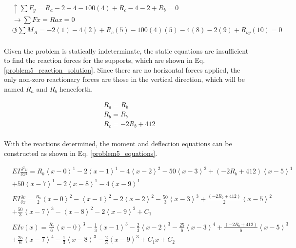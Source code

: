 \documentclass[a4paper]{article}
\begin{document}
\begin{equation}
\begin{split}
    &\uparrow \sum F_y = R_a - 2 - 4 - 100(4) + R_c -4 -2 + R_b = 0 \\
     &\rightarrow \sum Fx = R{ax} = 0 \\
     &\circlearrowleft \sum M_A = -2(1) - 4(2) + R_c(5) -100(4)(5) - 4(8) - 2(9) + R_{by}(10) = 0 \\
\end{split}
\label{problem5_reaction_equation}
\end{equation}

Given the problem is statically indeterminate, the static equations are insufficient to find the reaction forces for the supports, which are shown in Eq. \ref{problem5_reaction_solution}. Since there are no horizontal forces applied, the only non-zero reactionary forces are those in the vertical direction, which will be named $R_a$ and $R_b$ henceforth.

\begin{equation}
\begin{split}
    & R_a = R_b \\
    & R_b = R_b \\
    & R_c = -2R_b + 412 \\
\end{split}
\label{problem5_reaction_solution}
\end{equation}

With the reactions determined, the moment and deflection equations can be constructed as shown in Eq. \ref{problem5_equations}.

\begin{equation}
    \begin{split}
& EI \frac{\delta^2 v}{\delta x^2} = R_b\left<x-0\right>^1 - 2\left<x-1\right>^1 -  4\left<x-2\right>^2 - 50\left<x-3\right>^2 + (-2R_b+412)\left<x-5\right>^1 \\
& + 50\left<x-7\right>^1 - 2\left<x-8\right>^1 -  4\left<x-9\right>^1 \\
& \\
& EI \frac{\delta v}{\delta x} = \frac{R_b}{2}\left<x-0\right>^2 - \left<x-1\right>^2 -  2\left<x-2\right>^2 - \frac{50}{3}\left<x-3\right>^3 + \frac{(-2R_b+412)}{2}\left<x-5\right>^2 \\
& + \frac{50}{3}\left<x-7\right>^3 - \left<x-8\right>^2 -  2\left<x-9\right>^2  + C_1\\
& \\
& EI v(x) = \frac{R_b}{6}\left<x-0\right>^3 - \frac{1}{3}\left<x-1\right>^3 -  \frac{2}{3}\left<x-2\right>^3 - \frac{25}{6}\left<x-3\right>^4 + \frac{(-2R_b+412)}{6}\left<x-5\right>^3 \\
&  + \frac{25}{6}\left<x-7\right>^4 - \frac{1}{3}\left<x-8\right>^3 -  \frac{2}{3}\left<x-9\right>^3 + C_1x + C_2 \\
\end{split}
\label{problem5_equations}
\end{equation}
\end{document}
